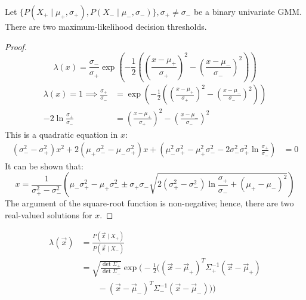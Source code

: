 \begin{proposition}
  Let $\{ P(X_+ \mid \mu_+, \sigma_+), P(X_- \mid \mu_-, \sigma_-) \}, \sigma_+
    \neq \sigma_-$ be a binary univariate GMM.
  There are two maximum-likelihood decision thresholds.
  \begin{proof}
    \begin{equation*}
      \lambda(x)
      = \frac{\sigma_-}{\sigma_+}\exp\left(-\frac{1}{2}\left(
        \left(\frac{x - \mu_+}{\sigma_+} \right)^2 -
        \left(\frac{x - \mu_-}{\sigma_-} \right)^2
        \right)\right)
    \end{equation*}
    \begin{align*}
      \lambda(x) = 1 \implies \frac{\sigma_+}{\sigma_-}
       & = \exp\left(-\frac{1}{2}\left(
        \left(\frac{x - \mu_+}{\sigma_+} \right)^2 -
        \left(\frac{x - \mu_-}{\sigma_-} \right)^2
        \right)\right)
      \\[2ex]
      -2 \ln \frac{\sigma_+}{\sigma_-}
       & = \left(\frac{x - \mu_+}{\sigma_+} \right)^2 -
      \left(\frac{x - \mu_-}{\sigma_-} \right)^2
    \end{align*}
    This is a quadratic equation in $x$:
    \begin{align*}
      \left(\sigma_-^2 - \sigma_+^2\right) x^2
      + 2\left(\mu_+\sigma_-^2 - \mu_-\sigma_+^2\right) x
      + \left(
      \mu_-^2\sigma_+^2 -
      \mu_+^2\sigma_-^2 -
      2\sigma_-^2\sigma_+^2\ln\frac{\sigma_+}{\sigma_-}
      \right)
       & = 0
    \end{align*}
    It can be shown that:
    \begin{equation*}
      x = \frac{1}{\sigma_+^2 - \sigma_-^2}\left(
      \mu_-\sigma_+^2 - \mu_+\sigma_-^2 \pm
      \sigma_+\sigma_-\sqrt{
          2(\sigma_+^2 - \sigma_-^2)\ln\frac{\sigma_+}{\sigma_-} +
          (\mu_+ - \mu_-)^2
        }
      \right)
    \end{equation*}
    The argument of the square-root function is non-negative; hence, there are two
    real-valued solutions for $x$.
  \end{proof}
\end{proposition}

\begin{proposition}
  \begin{align*}
    \lambda(\vec{x})
     & = \frac{P(\vec{x} \mid X_+)}{P(\vec{x} \mid X_-)}
    \\[2ex]
     & = \sqrt{\frac{\det\Sigma_+}{\det\Sigma_-}} \exp \Bigg( -\frac{1}{2} \bigg(
      \left(\vec{x} - \vec{\mu}_+ \right)^T \Sigma_+^{-1} \left(\vec{x} - \vec{\mu}_+ \right)
    \\
     & \qquad - \left(\vec{x} - \vec{\mu}_- \right)^T \Sigma_-^{-1} \left(\vec{x} - \vec{\mu}_- \right)
      \bigg) \Bigg)
  \end{align*}
\end{proposition}

